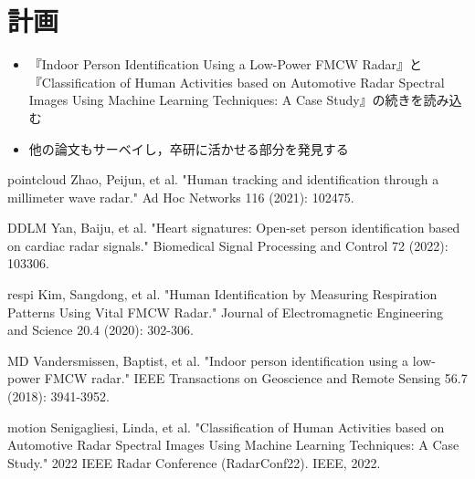 \documentclass[dvipdfmx]{jsarticle}
\begin{document}
\section{計画}
\begin{itemize}
    \item 『Indoor Person Identification Using a Low-Power FMCW Radar』と『Classification of Human Activities based on Automotive Radar Spectral Images Using Machine Learning Techniques: A Case Study』の続きを読み込む
    \item 他の論文もサーベイし，卒研に活かせる部分を発見する
\end{itemize}

\begin{thebibliography}{}
    \item{pointcloud} Zhao, Peijun, et al. "Human tracking and identification through a millimeter wave radar." Ad Hoc Networks 116 (2021): 102475.
    \item{DDLM} Yan, Baiju, et al. "Heart signatures: Open-set person identification based on cardiac radar signals." Biomedical Signal Processing and Control 72 (2022): 103306.
    \item{respi} Kim, Sangdong, et al. "Human Identification by Measuring Respiration Patterns Using Vital FMCW Radar." Journal of Electromagnetic Engineering and Science 20.4 (2020): 302-306. 
    \item{MD} Vandersmissen, Baptist, et al. "Indoor person identification using a low-power FMCW radar." IEEE Transactions on Geoscience and Remote Sensing 56.7 (2018): 3941-3952.
    \item{motion} Senigagliesi, Linda, et al. "Classification of Human Activities based on Automotive Radar Spectral Images Using Machine Learning Techniques: A Case Study." 2022 IEEE Radar Conference (RadarConf22). IEEE, 2022.
\end{thebibliography}
\end{document}
